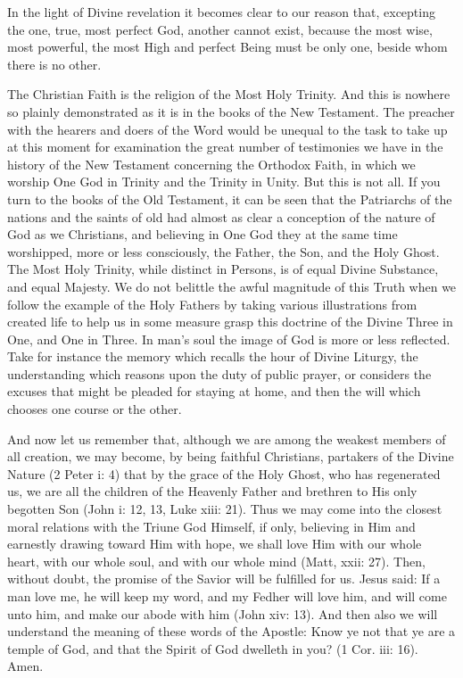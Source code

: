 In the light of Divine revelation it becomes 
clear to our reason that, excepting the one, true, 
most perfect God, another cannot exist, because 
the most wise, most powerful, the most High and 
perfect Being must be only one, beside whom 
there is no other. 

The Christian Faith is the religion of the 
Most Holy Trinity. And this is nowhere so 
plainly demonstrated as it is in the books of the 
New Testament. The preacher with the hearers 
and doers of the Word would be unequal to the 
task to take up at this moment for examination 
the great number of testimonies we have in the 
history of the New Testament concerning the 
Orthodox Faith, in which we worship One God 
in Trinity and the Trinity in Unity. But this is 
not all. If you turn to the books of the Old
Testament, it can be seen that the Patriarchs of 
the nations and the saints of old had almost as 
clear a conception of the nature of God as we 
Christians, and believing in One God they at the 
same time worshipped, more or less consciously, 
the Father, the Son, and the Holy Ghost. The 
Most Holy Trinity, while distinct in Persons, is 
of equal Divine Substance, and equal Majesty. 
We do not belittle the awful magnitude of this 
Truth when we follow the example of the Holy 
Fathers by taking various illustrations from 
created life to help us in some measure grasp 
this doctrine of the Divine Three in One, and 
One in Three. In man's soul the image of God 
is more or less reflected. Take for instance the 
memory which recalls the hour of Divine Liturgy,
the understanding which reasons upon the 
duty of public prayer, or considers the excuses 
that might be pleaded for staying at home, and 
then the will which chooses one course or the 
other. 

And now let us remember that, although we 
are among the weakest members of all creation, 
we may become, by being faithful Christians, 
partakers of the Divine Nature (2 Peter i: 4) 
that by the grace of the Holy Ghost, who has 
regenerated us, we are all the children of the
Heavenly Father and brethren to His only begotten
Son (John i: 12, 13, Luke xiii: 21). Thus 
we may come into the closest moral relations 
with the Triune God Himself, if only, believing 
in Him and earnestly drawing toward Him with 
hope, we shall love Him with our whole heart, 
with our whole soul, and with our whole mind 
(Matt, xxii: 27). Then, without doubt, the promise 
of the Savior will be fulfilled for us. Jesus said: 
If a man love me, he will keep my word, and 
my Fedher will love him, and will come unto 
him, and make our abode with him (John xiv: 13). 
And then also we will understand the meaning 
of these words of the Apostle: Know ye not 
that ye are a temple of God, and that the Spirit 
of God dwelleth in you? (1 Cor. iii: 16). Amen.
